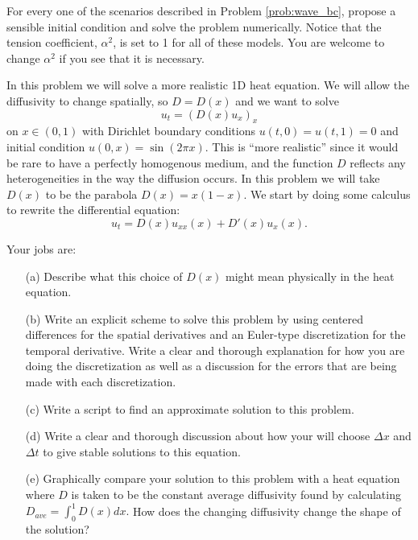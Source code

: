 \begin{problem}
    For every one of the scenarios described in Problem \ref{prob:wave_bc}, propose a
    sensible initial condition and solve the problem numerically.  Notice that the
    tension coefficient, $\alpha^2$, is set to 1 for all of these models.  You are welcome to
    change $\alpha^2$ if you see that it is necessary.
\end{problem}

\begin{problem}
    In this problem we will solve a more realistic 1D heat equation.  We will allow the
    diffusivity to change spatially, so $D = D(x)$ and we want to solve
    \[ u_t = \left( D(x) u_x \right)_x \]
    on $x \in (0,1)$ with Dirichlet boundary conditions $u(t,0) = u(t,1) = 0$ and initial
    condition $u(0,x) = \sin(2 \pi x)$.  This is ``more realistic'' since it would be rare
    to have a perfectly homogenous medium, and the function $D$ reflects any
    heterogeneities in the way the diffusion occurs.  In this problem we will take $D(x)$
    to be the parabola $D(x)= x(1-x)$. We start by doing some calculus to rewrite the
    differential equation:
    \[ u_t = D(x) u_{xx}(x) + D'(x) u_x(x). \]

    Your jobs are:
    \begin{enumerate}
        \item[(a)] Describe what this choice of $D(x)$ might mean physically in the heat
            equation.
        \item[(b)] Write an explicit scheme to solve this problem by using centered differences
            for the spatial derivatives and an Euler-type discretization for the temporal
            derivative.  Write a clear and thorough explanation for how you are doing the
            discretization as well as a discussion for the errors that are being made with
            each discretization.
        \item[(c)] Write a \ProgLang script to find an approximate solution to this problem.
        \item[(d)] Write a clear and thorough discussion about how your will choose $\Delta x$
            and $\Delta t$ to give stable solutions to this equation.
        \item[(e)] Graphically compare your solution to this problem with a heat equation
            where $D$ is taken to be the constant average diffusivity found by calculating
            $D_{ave} = \int_0^1 D(x) dx.$  How does the changing diffusivity change the
            shape of the solution?
    \end{enumerate}

\end{problem}

